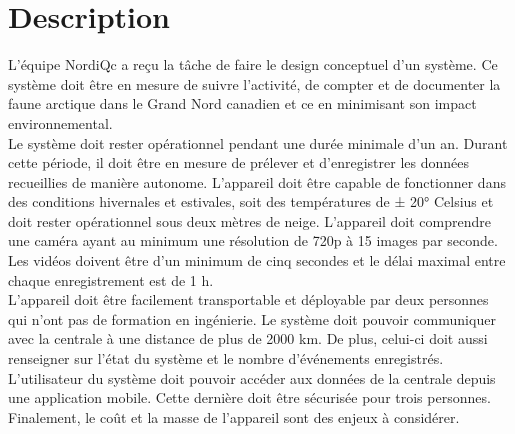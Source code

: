 \chapter{Description}
\label{s:structure_rapport}

L'équipe NordiQc a reçu la tâche de faire le design conceptuel d’un système. Ce
système doit être en mesure de suivre l’activité, de compter et de documenter
la faune arctique dans le Grand Nord canadien et ce en minimisant son impact
environnemental. \\

Le système doit rester opérationnel pendant une durée minimale d’un an. Durant
cette période, il doit être en mesure de prélever et d’enregistrer les données
recueillies de manière autonome. L’appareil doit être capable de fonctionner
dans des conditions hivernales et estivales, soit des températures de ± 20°
Celsius et doit rester opérationnel sous deux mètres de neige. L’appareil doit
comprendre une caméra ayant au minimum une résolution de 720p à 15 images par
seconde. Les vidéos doivent être d’un minimum de cinq secondes et le délai
maximal entre chaque enregistrement est de 1 h. \\

L’appareil doit être facilement transportable et déployable par deux personnes
qui n’ont pas de formation en ingénierie. Le système doit pouvoir communiquer
avec la centrale à une distance de plus de 2000 km. De plus, celui-ci doit
aussi renseigner sur l’état du système et le nombre d’événements enregistrés.
L’utilisateur du système doit pouvoir accéder aux données de la centrale depuis
une application mobile. Cette dernière doit être sécurisée pour trois
personnes. Finalement, le coût et la masse de l’appareil sont des enjeux à
considérer.
